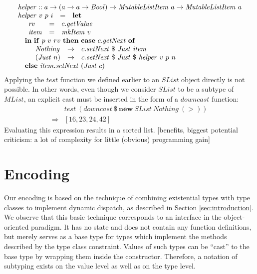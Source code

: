 \documentclass[runningheads,a4paper]{llncs}
\newcommand{\todo}[1]{[{\color{blue}#1}]}
\begin{document}
\begin{displaymath}
\begin{array}{lcl}
\multicolumn{3}{l}{\mathit{helper} :: a \to (a \to a \to \mathit{Bool}) \to \mathit{MutableListItem}~a \to \mathit{MutableListItem}~a} \\
\mathit{helper}~v~p~i & = & \mathbf{let} \\
\multicolumn{3}{l}{\quad \begin{array}{lcl}
\mathit{rv} & = & c.\mathit{getValue} \\
\mathit{item} & = & \mathit{mkItem}~v
\end{array}}\\
\multicolumn{3}{l}{\quad \mathbf{in}~\mathbf{if}~p~v~rv~\mathbf{then}~\mathbf{case}~c.\mathit{getNext}~\mathbf{of}} \\
\multicolumn{3}{l}{\quad \quad \begin{array}{lcl}
\mathit{Nothing} & \to & c.\mathit{setNext}~\$~\mathit{Just}~\mathit{item} \\
(\mathit{Just}~n) & \to & c.\mathit{setNext}~\$~\mathit{Just}~\$~\mathit{helper}~v~p~n 
\end{array}} \\
\multicolumn{3}{l}{\quad \mathbf{else}~\mathit{item}.\mathit{setNext}~(\mathit{Just}~c)}
\end{array}
\end{displaymath}
Applying the $\mathit{test}$ function we defined earlier to an $\mathit{SList}$ object directly is not possible. In other words, even though we consider $\mathit{SList}$ to be a subtype of $\mathit{MList}$, an explicit cast must be inserted in the form of a $\mathit{downcast}$ function:
\begin{displaymath}
\begin{array}{cl}
 & \mathit{test}~(downcast~\$~\mathbf{new}~\mathit{SList}~\mathit{Nothing}~(>)) \\
\Rightarrow & [16,23,24,42]
\end{array}
\end{displaymath}   
Evaluating this expression results in a sorted list. \todo{benefits, biggest potential criticism: a lot of complexity for little (obvious) programming gain}

\section{Encoding}
\label{sec:encoding}

Our encoding is based on the technique of combining existential types with type classes to implement dynamic dispatch, as described in Section \ref{sec:introduction}. We observe that this basic technique corresponds to an interface in the object-oriented paradigm. It has no state and does not contain any function definitions, but merely serves as a base type for types which implement the methods described by the type class constraint. Values of such types can be ``cast'' to the base type by wrapping them inside the constructor. Therefore, a notation of subtyping exists on the value level as well as on the type level.
\end{document}
